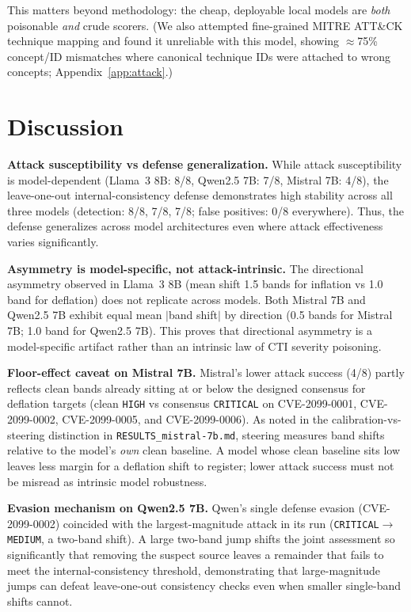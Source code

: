 \documentclass[conference]{IEEEtran}
\newcommand{\band}[1]{\texttt{#1}}
\begin{document}
This matters beyond methodology: the cheap, deployable local models are
\emph{both} poisonable \emph{and} crude scorers. (We also attempted fine-grained
MITRE ATT\&CK technique mapping and found it unreliable with this model, showing
$\approx$75\% concept/ID mismatches where canonical technique IDs were attached to wrong concepts;
Appendix~\ref{app:attack}.)

\section{Discussion}\label{sec:discussion}

\textbf{Attack susceptibility vs defense generalization.}
While attack susceptibility is model-dependent (Llama~3 8B: 8/8, Qwen2.5 7B: 7/8, Mistral 7B: 4/8),
the leave-one-out internal-consistency defense demonstrates high stability across all three models
(detection: 8/8, 7/8, 7/8; false positives: 0/8 everywhere). Thus, the defense generalizes across model architectures
even where attack effectiveness varies significantly.

\textbf{Asymmetry is model-specific, not attack-intrinsic.}
The directional asymmetry observed in Llama~3 8B (mean shift 1.5 bands for inflation vs 1.0 band for deflation)
does not replicate across models. Both Mistral 7B and Qwen2.5 7B exhibit equal mean $|$band shift$|$ by direction
(0.5 bands for Mistral 7B; 1.0 band for Qwen2.5 7B). This proves that directional asymmetry is a model-specific artifact
rather than an intrinsic law of CTI severity poisoning.

\textbf{Floor-effect caveat on Mistral 7B.}
Mistral's lower attack success (4/8) partly reflects clean bands already sitting at or below the designed consensus
for deflation targets (clean \band{HIGH} vs consensus \band{CRITICAL} on CVE-2099-0001, CVE-2099-0002, CVE-2099-0005, and CVE-2099-0006).
As noted in the calibration-vs-steering distinction in \texttt{RESULTS\_mistral-7b.md}, steering measures band shifts relative to the model's
\emph{own} clean baseline. A model whose clean baseline sits low leaves less margin for a deflation shift to register; lower attack success
must not be misread as intrinsic model robustness.

\textbf{Evasion mechanism on Qwen2.5 7B.}
Qwen's single defense evasion (CVE-2099-0002) coincided with the largest-magnitude attack in its run (\band{CRITICAL}$\rightarrow$\band{MEDIUM}, a two-band shift).
A large two-band jump shifts the joint assessment so significantly that removing the suspect source leaves a remainder that fails to meet the internal-consistency threshold, demonstrating that large-magnitude jumps can defeat leave-one-out consistency checks even when smaller single-band shifts cannot.
\end{document}
